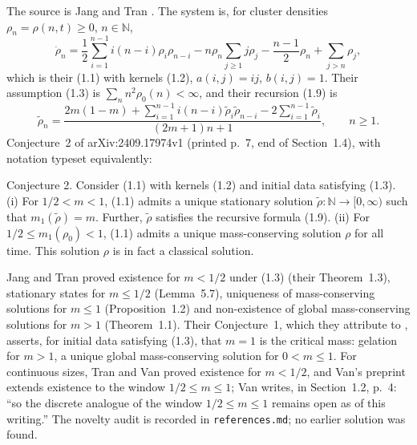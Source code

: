 \documentclass[11pt,a4paper]{report}
\newcommand{\NN}{\mathbb N}
\newcommand{\rtil}{\tilde\rho}
\begin{document}
The source is Jang and Tran \autocite{JangTran2025}. The system is, for cluster densities
\(\rho_n=\rho(n,t)\ge0\), \(n\in\NN\),
\begin{equation}\label{eq:system}
\dot\rho_n=\frac12\sum_{i=1}^{n-1}i(n-i)\rho_i\rho_{n-i}-n\rho_n\sum_{j\ge1}j\rho_j
-\frac{n-1}{2}\rho_n+\sum_{j>n}\rho_j ,
\end{equation}
which is their (1.1) with kernels (1.2), \(a(i,j)=ij\), \(b(i,j)=1\). Their assumption (1.3) is
\(\sum_n n^2\rho_0(n)<\infty\), and their recursion (1.9) is
\begin{equation}\label{eq:recursion}
\rtil_n=\frac{2m(1-m)+\sum_{i=1}^{n-1}i(n-i)\rtil_i\rtil_{n-i}-2\sum_{i=1}^{n-1}\rtil_i}{(2m+1)n+1},
\qquad n\ge1 .
\end{equation}
Conjecture~2 of arXiv:2409.17974v1 (printed p.~7, end of Section~1.4), with notation typeset equivalently:
\begin{openquote}
Conjecture 2. Consider (1.1) with kernels (1.2) and initial data satisfying (1.3).
(i) For \(1/2<m<1\), (1.1) admits a unique stationary solution \(\tilde\rho:\NN\to[0,\infty)\) such that
\(m_1(\tilde\rho)=m\). Further, \(\tilde\rho\) satisfies the recursive formula (1.9).
(ii) For \(1/2\le m_1(\rho_0)<1\), (1.1) admits a unique mass-conserving solution \(\rho\) for all time.
This solution \(\rho\) is in fact a classical solution.
\end{openquote}
Jang and Tran proved existence for \(m<1/2\) under (1.3) (their Theorem~1.3), stationary states for
\(m\le1/2\) (Lemma~5.7), uniqueness of mass-conserving solutions for \(m\le1\) (Proposition~1.2) and
non-existence of global mass-conserving solutions for \(m>1\) (Theorem~1.1). Their Conjecture~1, which
they attribute to \autocite{EMP2002,ELMP2003}, asserts, for initial data satisfying (1.3), that \(m=1\) is
the critical mass: gelation for \(m>1\), a unique global mass-conserving solution for \(0<m\le1\).
For continuous sizes, Tran and Van \autocite{TranVan2022} proved existence for \(m<1/2\), and
Van's preprint \autocite{Van2026} extends existence to the window \(1/2\le m\le1\); Van writes, in
Section~1.2, p.~4: ``so the discrete analogue of the window \(1/2\le m\le1\) remains open as of this writing.''
The novelty audit is recorded in \texttt{references.md}; no earlier solution was found.
\end{document}
